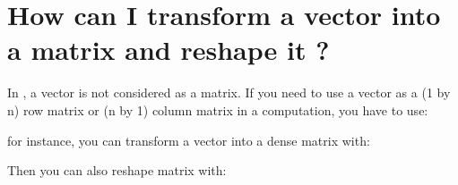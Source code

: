 \documentclass[a4paper,11pt,english]{sphinxmanual}
\begin{document}
\section{How can I transform a vector into a matrix and reshape it ?}
\label{\detokenize{gmm/first-step:how-can-i-transform-a-vector-into-a-matrix-and-reshape-it}}
In , a vector is not considered as a matrix. If you need to use a vector as a (1 by n) row matrix or (n by 1) column matrix in a computation, you have to use:

\begin{sphinxVerbatim}[commandchars=\\\{\}]
 
 
\end{sphinxVerbatim}

for instance, you can transform a vector into a dense matrix with:

\begin{sphinxVerbatim}[commandchars=\\\{\}]
 


  
 
\end{sphinxVerbatim}

Then you can also reshape matrix  with:

\begin{sphinxVerbatim}[commandchars=\\\{\}]
  
\end{sphinxVerbatim}
\end{document}
